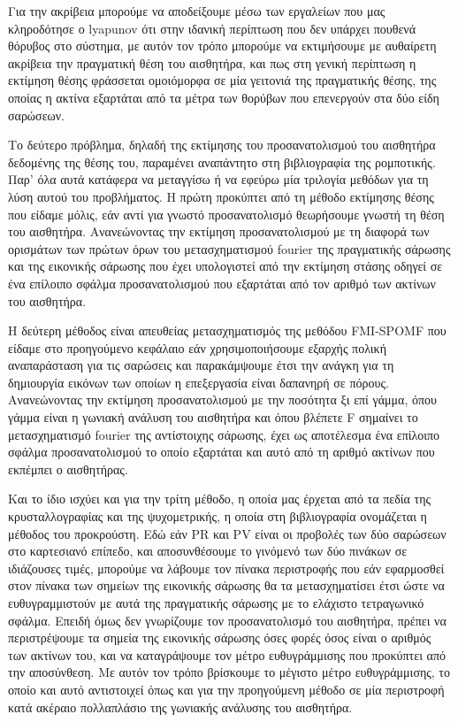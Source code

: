 \documentclass[a4paper,10pt]{article}
\begin{document}
Για την ακρίβεια μπορούμε να αποδείξουμε μέσω των εργαλείων που μας κληροδότησε
ο lyapunov ότι στην ιδανική περίπτωση που δεν υπάρχει πουθενά θόρυβος στο
σύστημα, με αυτόν τον τρόπο μπορούμε να εκτιμήσουμε με αυθαίρετη ακρίβεια την
πραγματική θέση του αισθητήρα, και πως στη γενική περίπτωση η εκτίμηση θέσης
φράσσεται ομοιόμορφα σε μία γειτονιά της πραγματικής θέσης, της οποίας η ακτίνα
εξαρτάται από τα μέτρα των θορύβων που επενεργούν στα δύο είδη σαρώσεων.

Το δεύτερο πρόβλημα, δηλαδή της εκτίμησης του προσανατολισμού του αισθητήρα
δεδομένης της θέσης του, παραμένει αναπάντητο στη βιβλιογραφία της ρομποτικής.
Παρ' όλα αυτά κατάφερα να μεταγγίσω ή να εφεύρω μία τριλογία μεθόδων για τη
λύση αυτού του προβλήματος. Η πρώτη προκύπτει από τη μέθοδο εκτίμησης θέσης που
είδαμε μόλις, εάν αντί για γνωστό προσανατολισμό θεωρήσουμε γνωστή τη θέση του
αισθητήρα.  Ανανεώνοντας την εκτίμηση προσανατολισμού με τη διαφορά των
ορισμάτων των πρώτων όρων του μετασχηματισμού fourier της πραγματικής σάρωσης
και της εικονικής σάρωσης που έχει υπολογιστεί από την εκτίμηση στάσης οδηγεί
σε ένα επίλοιπο σφάλμα προσανατολισμού που εξαρτάται από τον αριθμό των ακτίνων
του αισθητήρα.

Η δεύτερη μέθοδος είναι απευθείας μετασχηματισμός της μεθόδου FMI-SPOMF που
είδαμε στο προηγούμενο κεφάλαιο εάν χρησιμοποιήσουμε εξαρχής πολική
αναπαράσταση για τις σαρώσεις και παρακάμψουμε έτσι την ανάγκη για τη
δημιουργία εικόνων των οποίων η επεξεργασία είναι δαπανηρή σε πόρους.
Ανανεώνοντας την εκτίμηση προσανατολισμού με την ποσότητα ξι επί γάμμα, όπου
γάμμα είναι η γωνιακή ανάλυση του αισθητήρα και όπου βλέπετε F σημαίνει το
μετασχηματισμό fourier της αντίστοιχης σάρωσης, έχει ως αποτέλεσμα ένα επίλοιπο
σφάλμα προσανατολισμού το οποίο εξαρτάται και αυτό από τη αριθμό ακτίνων που
εκπέμπει ο αισθητήρας.

Και το ίδιο ισχύει και για την τρίτη μέθοδο, η οποία μας έρχεται από τα πεδία
της κρυσταλλογραφίας και της ψυχομετρικής, η οποία στη βιβλιογραφία ονομάζεται
η μέθοδος του προκρούστη. Εδώ εάν PR και PV είναι οι προβολές των
δύο σαρώσεων στο καρτεσιανό επίπεδο, και αποσυνθέσουμε το γινόμενό των δύο
πινάκων σε ιδιάζουσες τιμές, μπορούμε να λάβουμε τον πίνακα περιστροφής που
εάν εφαρμοσθεί στον πίνακα των σημείων της εικονικής σάρωσης θα τα μετασχηματίσει
έτσι ώστε να ευθυγραμμιστούν με αυτά της πραγματικής σάρωσης με το ελάχιστο
τετραγωνικό σφάλμα. Επειδή όμως δεν γνωρίζουμε τον προσανατολισμό του
αισθητήρα, πρέπει να περιστρέψουμε τα σημεία της εικονικής σάρωσης όσες φορές
όσος είναι ο αριθμός των ακτίνων του, και να καταγράψουμε τον μέτρο
ευθυγράμμισης που προκύπτει από την αποσύνθεση. Με αυτόν τον τρόπο βρίσκουμε
το μέγιστο μέτρο ευθυγράμμισης, το οποίο και αυτό αντιστοιχεί όπως και για την
προηγούμενη μέθοδο σε μία περιστροφή κατά ακέραιο πολλαπλάσιο της γωνιακής
ανάλυσης του αισθητήρα.
\end{document}
